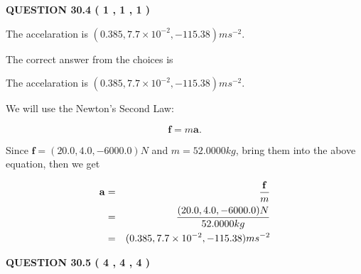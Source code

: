 \documentclass[12pt]{article}
\begin{document}
 
 
 
  
\vspace{0.2in}
  
{\textbf{\Large{QUESTION
30.4 
 (           1 ,           1 ,           1 )
}}}
  
  


 
 
\noindent{}
 
 
The accelaration is $  %
(
0.385,
7.7 \times 10^{-2},
-115.38)
ms^{-2} $.
 
 
 
 
 
 
\noindent{}

The correct answer from the choices is


The accelaration is $  %
(
0.385,
7.7 \times 10^{-2},
-115.38)
ms^{-2} $.
 
 
 
 
 
\noindent{}

We will use the Newton's Second Law:
 
\[
\mathbf{f}=m\mathbf{a}.
\]
 
Since $\mathbf{f}= %
(20.0 , 4.0 , -6000.0) N$
and $m= %
52.0000kg$, bring them into the above equation, then we get
 
\begin{eqnarray*}
\mathbf{a}&=&\frac{\mathbf{f}}m  \\
&=&\frac{ %
(20.0 , 4.0 , -6000.0) N}{ %
52.0000kg}  \\
&=& %
(0.385 , 7.7 \times 10^{-2} , -115.38) ms^{-2}
\end{eqnarray*}
 
 
 
  
\vspace{0.2in}
  
{\textbf{\Large{QUESTION
30.5 
 (           4 ,           4 ,           4 )
}}}
  
  
 
 
\noindent{}
  
\end{document}
